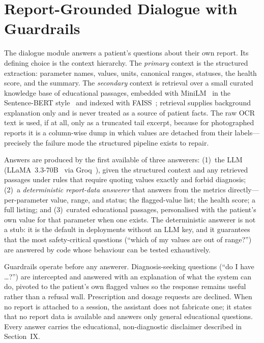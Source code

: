 \documentclass[conference]{IEEEtran}
\begin{document}
\section{Report-Grounded Dialogue with Guardrails}
The dialogue module answers a patient's questions about their own
report. Its defining choice is the context hierarchy. The \emph{primary}
context is the structured extraction: parameter names, values, units,
canonical ranges, statuses, the health score, and the summary. The
\emph{secondary} context is retrieval over a small curated knowledge
base of educational passages, embedded with
MiniLM~\cite{wang2020minilm} in the Sentence-BERT
style~\cite{reimers2019sbert} and indexed with
FAISS~\cite{johnson2019faiss}; retrieval supplies background explanation
only and is never treated as a source of patient facts. The raw OCR
text is used, if at all, only as a truncated tail excerpt, because for
photographed reports it is a column-wise dump in which values are
detached from their labels---precisely the failure mode the structured
pipeline exists to repair.

Answers are produced by the first available of three answerers:
(1)~the LLM (LLaMA~3.3-70B~\cite{llama3herd2024} via
Groq~\cite{abts2020groq}), given the structured context and any
retrieved passages under rules that require quoting values exactly and
forbid diagnosis; (2)~a \emph{deterministic report-data answerer} that
answers from the metrics directly---per-parameter value, range, and
status; the flagged-value list; the health score; a full listing; and
(3)~curated educational passages, personalised with the patient's own
value for that parameter when one exists. The deterministic answerer is
not a stub: it is the default in deployments without an LLM key, and
it guarantees that the most safety-critical questions (``which of my
values are out of range?'') are answered by code whose behaviour can be
tested exhaustively.

Guardrails operate before any answerer. Diagnosis-seeking questions
(``do I have \ldots?'') are intercepted and answered with an explanation
of what the system can do, pivoted to the patient's own flagged values
so the response remains useful rather than a refusal wall.
Prescription and dosage requests are declined. When no report is
attached to a session, the assistant does not fabricate one; it states
that no report data is available and answers only general educational
questions. Every answer carries the educational, non-diagnostic
disclaimer described in Section~IX.
\end{document}
